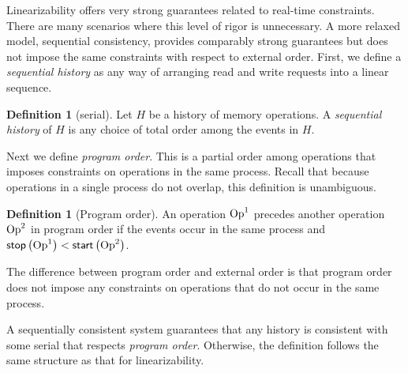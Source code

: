 \documentclass[]             %
{NASA}                       %
\theoremstyle{definition}
\newtheorem{definition}[theorem]{Definition}
\begin{document}
Linearizability offers very strong guarantees related to real-time
constraints. There are many scenarios where this level of rigor is
unnecessary. A more relaxed model, sequential consistency, provides
comparably strong guarantees but does not impose the same constraints
with respect to external order. First, we define a \emph{sequential
  history} as any way of arranging read and write requests into a
linear sequence.

\begin{definition}[serial]
  \label{def:sequential-history}
  Let $H$ be a history of memory operations. A \emph{sequential
    history} of $H$ is any choice of total order among the events in
  $H$.
\end{definition}

Next we define \emph{program order}. This is a partial order among
operations that imposes constraints on operations in the same
process. Recall that because operations in a single process do not
overlap, this definition is unambiguous.

\begin{definition}[Program order]
  An operation $\mathrm{Op}^1$ precedes another operation $\mathrm{Op}^2$ in program
  order if the events occur in the same process and
  $\mathsf{stop}\left(\mathrm{Op}^1\right) < \mathsf{start}\left(\mathrm{Op}^2\right)$.
\end{definition}

The difference between program order and external order is that
program order does not impose any constraints on operations that do
not occur in the same process.

A sequentially consistent system guarantees that any history is
consistent with some serial that respects \emph{program
  order}. Otherwise, the definition follows the same structure as that
for linearizability.

\end{document}
